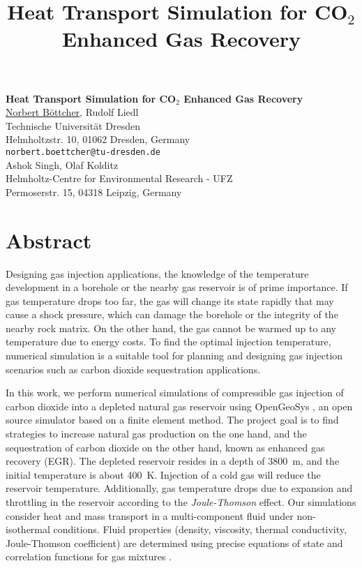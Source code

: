 \title{Heat Transport Simulation for CO$_2$ Enhanced Gas Recovery}
\author{} \institute{}

\begin{center}

\textbf{\Large Heat Transport Simulation for CO$_2$ Enhanced Gas Recovery}\\
\vspace{10mm}
{\large \underline{Norbert B\"ottcher}, Rudolf Liedl}\\
Technische Universit\"at Dresden\\
Helmholtzstr. 10, 01062 Dresden, Germany\\
{\tt norbert.boettcher@tu-dresden.de}\\
\vspace{4mm}
{\large Ashok Singh, Olaf Kolditz}\\
Helmholtz-Centre for Environmental Research - UFZ\\
Permoserstr. 15, 04318 Leipzig, Germany

\end{center}

\section*{Abstract}

Designing gas injection applications, the knowledge of the temperature development in a borehole or the nearby gas reservoir is of prime importance. If gas temperature drops too far, the gas will change its state rapidly that may cause a shock pressure, which can damage the borehole or the integrity of the nearby rock matrix. On the other hand, the gas cannot be warmed up to any temperature due to energy costs. To find the optimal injection temperature, numerical simulation is a suitable tool for planning and designing gas injection scenarios such as carbon dioxide sequestration applications. 

In this work, we perform numerical simulations of compressible gas injection of carbon dioxide into a depleted natural gas reservoir using OpenGeoSys \cite{Wang2009}, an open source simulator based on a finite element method. The project goal is to find strategies to increase natural gas production on the one hand, and the sequestration of carbon dioxide on the other hand, known as enhanced gas recovery (EGR). The depleted reservoir resides in a depth of 3800~m, and the initial temperature is about 400~K. Injection of a cold gas will reduce the reservoir temperature. Additionally, gas temperature drops due to expansion and throttling in the reservoir according to the \textit{Joule-Thomson} \cite{SpaWag96} effect. Our simulations consider heat and mass transport in a multi-component fluid under non-isothermal conditions. Fluid properties (density, viscosity, thermal conductivity, Joule-Thomson coefficient) are determined using precise equations of state and correlation functions for gas mixtures \cite{Duan2008}.

